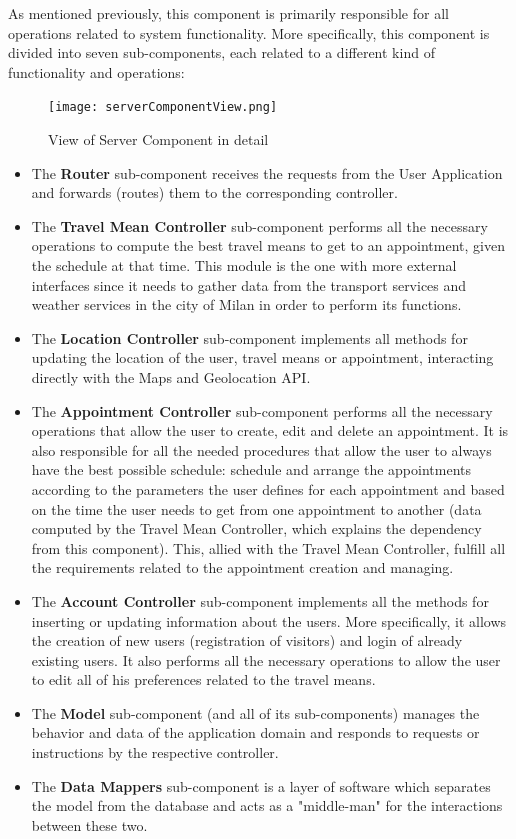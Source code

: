\documentclass[12pt]{article}
\begin{document}
As mentioned previously, this component is primarily responsible for all operations related to system functionality. More specifically, this component is divided into seven sub-components, each related to a different kind of functionality and operations:
\begin{figure}[H]
    \centering
    \texttt{[image: serverComponentView.png]}
    \caption{View of Server Component in detail}
    \label{fig:componentView}
\end{figure}
\begin{itemize}
    \item The \textbf{Router} sub-component receives the requests from the User Application and forwards (routes) them to the corresponding controller.
    \item The \textbf{Travel Mean Controller} sub-component performs all the necessary operations to compute the best travel means to get to an appointment, given the schedule at that time. This module is the one with more external interfaces since it needs to gather data from the transport services and weather services in the city of Milan in order to perform its functions.
    \item The \textbf{Location Controller} sub-component implements all methods for updating the location of the user, travel means or appointment, interacting directly with the Maps and Geolocation API.
    \item The \textbf{Appointment Controller} sub-component performs all the necessary operations that allow the user to create, edit and delete an appointment. It is also responsible for all the needed procedures that allow the user to always have the best possible schedule: schedule and arrange the appointments according to the parameters the user defines for each appointment and based on the time the user needs to get from one appointment to another (data computed by the Travel Mean Controller, which explains the dependency from this component). This, allied with the Travel Mean Controller, fulfill all the requirements related to the appointment creation and managing.
    \item The \textbf{Account Controller} sub-component implements all the methods for inserting or updating information about the users. More specifically, it allows the creation of new users (registration of visitors) and login of already existing users. It also performs all the necessary operations to allow the user to edit all of his preferences related to the travel means.
    \item The \textbf{Model} sub-component (and all of its sub-components) manages the behavior and data of the application domain and responds to requests or instructions by the respective controller.
    \item The \textbf{Data Mappers} sub-component is a layer of software which separates the model from the database and acts as a "middle-man" for the interactions between these two.
\end{itemize}
\end{document}
